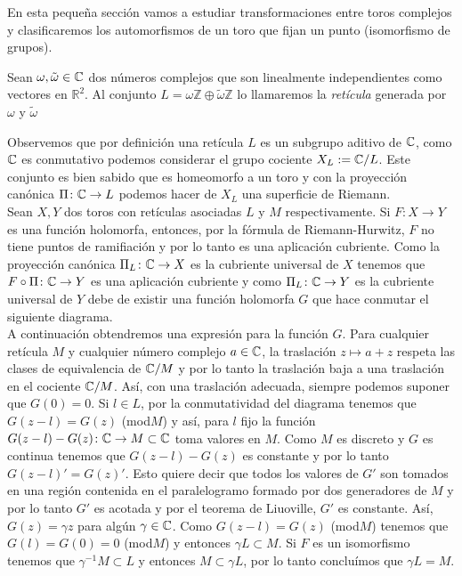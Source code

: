 En esta pequeña sección vamos a estudiar transformaciones entre toros complejos y clasificaremos los automorfismos de un toro que fijan un punto (isomorfismo de grupos).

\begin{defn}
\label{latiz}
Sean $\omega,\tilde{\omega}\in\mathbb{C}$ dos números complejos que son linealmente independientes como vectores en $\mathbb{R}^{2}$. Al conjunto $L=\omega\mathbb{Z}\oplus\tilde{\omega}\mathbb{Z}$ lo llamaremos la \emph{retícula} generada por $\omega$ y $\tilde{\omega}$
\end{defn}

Observemos que por definición una retícula $L$ es un subgrupo aditivo de $\mathbb{C}$, como $\mathbb{C}$ es conmutativo podemos considerar el grupo cociente $X_{L}:=\mathbb{C}/L$. Este conjunto es bien sabido que es homeomorfo a un toro y con la proyección canónica $\Pi\colon\mathbb{C}\rightarrow L$ podemos hacer de $X_{L}$ una superficie de Riemann.\\

Sean $X,Y$ dos toros con retículas asociadas $L$ y $M$ respectivamente. Si $F\colon X\rightarrow Y$ es una función holomorfa, entonces, por la fórmula de Riemann-Hurwitz, $F$ no tiene puntos de ramifiación y por lo tanto es una aplicación cubriente. Como la proyección canónica $\Pi_{L}\colon\mathbb{C}\rightarrow X$ es la  cubriente universal de $X$ tenemos que $F\circ\Pi\colon\mathbb{C}\rightarrow Y$ es una aplicación cubriente y como $\Pi_{L}\colon\mathbb{C}\rightarrow Y$ es la cubriente universal de $Y$ debe de existir una función holomorfa $G$ que hace conmutar el siguiente diagrama.\\


A continuación obtendremos una expresión para la función $G$. Para cualquier retícula $M$ y cualquier número complejo $a\in\mathbb{C}$, la traslación $z\mapsto a+z$ respeta las clases de equivalencia de $\mathbb{C}/M$ y por lo tanto la traslación baja a una traslación en el cociente $\mathbb{C}/M$. Así, con una traslación adecuada, siempre podemos suponer que $G(0)=0$. Si $l\in L$, por la conmutatividad del diagrama tenemos que $G(z-l)=G(z)$ (mod$M$) y así, para $l$ fijo la función $G(z-l)-G(z)\colon\mathbb{C}\rightarrow M\subset\mathbb{C}$ toma valores en $M$. Como $M$ es discreto y $G$ es continua tenemos que $G(z-l)-G(z)$ es constante y por lo tanto $G(z-l)'=G(z)'$. Esto quiere decir que todos los valores de $G'$ son tomados en una región contenida en el paralelogramo formado por dos generadores de $M$ y por lo tanto $G'$ es acotada y por el teorema de Liuoville, $G'$ es constante. Así, $G(z)=\gamma z$ para algún $\gamma\in\mathbb{C}$. Como $G(z-l)=G(z)$ (mod$M$) tenemos que $G(l)=G(0)=0$ (mod$M$) y entonces $\gamma L\subset M$. Si $F$ es un isomorfismo tenemos que $\gamma^{-1}M\subset L$ y entonces $M\subset\gamma L$, por lo tanto concluímos que $\gamma L = M$.\\


